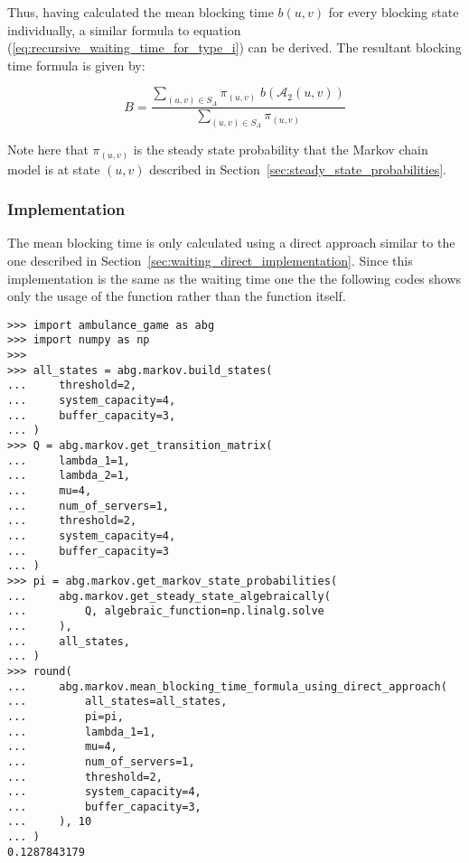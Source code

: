 Thus, having calculated the mean blocking time \(b(u,v)\) for every blocking
state individually, a similar formula to equation
(\ref{eq:recursive_waiting_time_for_type_i}) can be derived.
The resultant blocking time formula is given by:

\begin{equation}\label{eq:blocking_time_formula}
    B = \frac{\sum_{(u,v) \in S_A} \pi_{(u,v)} \; b(\mathcal{A}_2(u,v))}{
        \sum_{(u,v) \in S_A}\pi_{(u,v)}}
\end{equation}

Note here that \(\pi_(u,v)\) is the steady state probability that the Markov
chain model is at state \((u,v)\) described in
Section~\ref{sec:steady_state_probabilities}.

\subsubsection{Implementation}\label{sec:implementation_blocking_time}

The mean blocking time is only calculated using a direct approach
similar to the one described in Section~\ref{sec:waiting_direct_implementation}.
Since this implementation is the same as the waiting time one the the following
codes shows only the usage of the function rather than the function itself.

\begin{lstlisting}[style=pystyle]
>>> import ambulance_game as abg
>>> import numpy as np
>>>
>>> all_states = abg.markov.build_states(
...     threshold=2,
...     system_capacity=4,
...     buffer_capacity=3,
... )
>>> Q = abg.markov.get_transition_matrix(
...     lambda_1=1,
...     lambda_2=1,
...     mu=4,
...     num_of_servers=1,
...     threshold=2,
...     system_capacity=4,
...     buffer_capacity=3
... )
>>> pi = abg.markov.get_markov_state_probabilities(
...     abg.markov.get_steady_state_algebraically(
...         Q, algebraic_function=np.linalg.solve
...     ),
...     all_states,
... )
>>> round(
...     abg.markov.mean_blocking_time_formula_using_direct_approach(
...         all_states=all_states,
...         pi=pi,
...         lambda_1=1,
...         mu=4,
...         num_of_servers=1,
...         threshold=2,
...         system_capacity=4,
...         buffer_capacity=3,
...     ), 10
... )
0.1287843179

\end{lstlisting}
